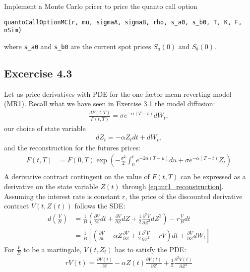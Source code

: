 \documentclass[10pt,a4paper,hidelinks,fleqn]{article}            %
\begin{document}
Implement a Monte Carlo pricer to price the quanto call option
\begin{verbatim}
quantoCallOptionMC(r, mu, sigmaA, sigmaB, rho, s_a0, s_b0, T, K, F, nSim)
\end{verbatim}
where \verb=s_a0= and \verb=s_b0= are the current spot prices $S_a(0)$ and $S_b(0)$.
\subsection*{Excercise 4.3}
Let us price derivatives with PDE for the one factor mean reverting model (MR1). 
Recall what we have seen in Exercise 3.1 the model diffusion:
\begin{align*}
\frac{dF(t, T)}{F(t, T)} = \sigma e^{-\alpha (T- t)} dW_t,
\end{align*}
our choice of state variable
\begin{align}
dZ_t = -\alpha Z_t dt + dW_t,
\end{align}
and the reconstruction for the futures prices:
\begin{align}
F(t, T) & = F(0, T) \exp\left( -\frac{\sigma^2}{2} \int_0^t e^{-2\alpha (T - u)} du + \sigma e^{-\alpha(T-t)} Z_t \right) \\
\label{eq:mr1_reconstruction}
\end{align}
A derivative contract contingent on the value of $F(t, T)$ can be expressed as a derivative on the state variable $Z(t)$ through \eqref{eq:mr1_reconstruction}.
Assuming the interest rate is constant $r$,
the price of the discounted derivative contract $V(t, Z(t))$ follows the SDE:
\begin{align}
d\left(\frac{V}{B}\right) & = \frac{1}{B}\left(\frac{\partial V}{\partial t} dt + \frac{\partial V}{\partial Z} dZ + \frac{1}{2}\frac{\partial^2 V}{\partial Z^2} dZ^2 \right) - r\frac{V}{B}dt  \\
   & = \frac{1}{B} \left[\left(\frac{\partial V}{\partial t} - \alpha Z\frac{\partial V}{\partial Z} + \frac{1}{2} \frac{\partial^2 V}{\partial Z^2} - rV\right)dt + \frac{\partial V}{\partial Z} dW_t \right]
\end{align}
For $\frac{V}{B}$ to be a martingale, $V(t, Z_t)$ has to satisfy the PDE:
\begin{align}
rV(t) = \frac{\partial V(t)}{\partial t} - \alpha Z(t) \frac{\partial V(t)}{\partial Z} + \frac{1}{2} \frac{\partial^2 V(t)}{\partial Z^2}
\end{align}
\end{document}
